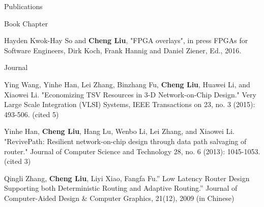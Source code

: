 \documentclass{resume} %
\begin{document}
\begin{rSection}{Publications}
    \begin{rSubsection} {Book Chapter}{}{}{}
    \item Hayden Kwok-Hay So and \textbf{Cheng Liu}, "FPGA overlays", in press FPGAs for Software
        Engineers, Dirk Koch, Frank Hannig and Daniel Ziener, Ed., 2016.  
    \end{rSubsection}

    \begin{rSubsection} {Journal}{}{}{}
    \item Ying Wang, Yinhe Han, Lei Zhang, Binzhang Fu, \textbf{Cheng Liu}, Huawei Li, and Xiaowei Li.
        "Economizing TSV Resources in 3-D Network-on-Chip Design." Very Large Scale Integration
        (VLSI) Systems, IEEE Transactions on 23, no. 3 (2015): 493-506. (cited 5)  
    \item Yinhe Han, \textbf{Cheng Liu}, Hang Lu, Wenbo Li, Lei Zhang, and Xiaowei Li. "RevivePath:
        Resilient network-on-chip design through data path salvaging of router." Journal of Computer
        Science and Technology 28, no. 6 (2013): 1045-1053. (cited 3)
    \item Qingli Zhang, \textbf{Cheng Liu}, Liyi Xiao, Fangfa Fu.” Low Latency Router Design Supporting both
        Deterministic Routing and Adaptive Routing.” Journal of Computer-Aided Design \& Computer
        Graphics, 21(12), 2009 (in Chinese)
    \end{rSubsection}


\end{rSection}
\end{document}
